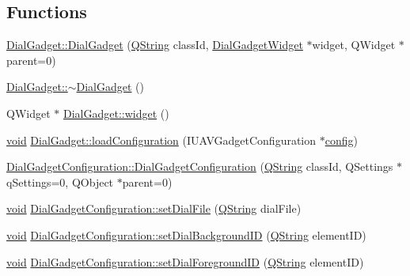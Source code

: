 \subsection*{Functions}
\begin{DoxyCompactItemize}
\item 
\hyperlink{group___dial_plugin_gaef5c9e1077a9a230622054bcc5337958}{Dial\-Gadget\-::\-Dial\-Gadget} (\hyperlink{group___u_a_v_objects_plugin_gab9d252f49c333c94a72f97ce3105a32d}{Q\-String} class\-Id, \hyperlink{class_dial_gadget_widget}{Dial\-Gadget\-Widget} $\ast$widget, Q\-Widget $\ast$parent=0)
\item 
\hyperlink{group___dial_plugin_ga9fc6ec1cdb4ac0de853c9b35950c4d11}{Dial\-Gadget\-::$\sim$\-Dial\-Gadget} ()
\item 
Q\-Widget $\ast$ \hyperlink{group___dial_plugin_ga1afd77bac7b60ceae978b7e74f9eddee}{Dial\-Gadget\-::widget} ()
\item 
\hyperlink{group___u_a_v_objects_plugin_ga444cf2ff3f0ecbe028adce838d373f5c}{void} \hyperlink{group___dial_plugin_ga571fd73249a763cfe4850be854e3dbc6}{Dial\-Gadget\-::load\-Configuration} (I\-U\-A\-V\-Gadget\-Configuration $\ast$\hyperlink{deflate_8c_a4473b5227787415097004fd39f55185e}{config})
\item 
\hyperlink{group___dial_plugin_ga5818a8a26f5b9e63b9bc37f459ca6594}{Dial\-Gadget\-Configuration\-::\-Dial\-Gadget\-Configuration} (\hyperlink{group___u_a_v_objects_plugin_gab9d252f49c333c94a72f97ce3105a32d}{Q\-String} class\-Id, Q\-Settings $\ast$q\-Settings=0, Q\-Object $\ast$parent=0)
\item 
\hyperlink{group___u_a_v_objects_plugin_ga444cf2ff3f0ecbe028adce838d373f5c}{void} \hyperlink{group___dial_plugin_ga7172a5e20f324dd2e11a31167ee87a9a}{Dial\-Gadget\-Configuration\-::set\-Dial\-File} (\hyperlink{group___u_a_v_objects_plugin_gab9d252f49c333c94a72f97ce3105a32d}{Q\-String} dial\-File)
\item 
\hyperlink{group___u_a_v_objects_plugin_ga444cf2ff3f0ecbe028adce838d373f5c}{void} \hyperlink{group___dial_plugin_gaed251d96de4cea86a69a9b52529c5c69}{Dial\-Gadget\-Configuration\-::set\-Dial\-Background\-I\-D} (\hyperlink{group___u_a_v_objects_plugin_gab9d252f49c333c94a72f97ce3105a32d}{Q\-String} element\-I\-D)
\item 
\hyperlink{group___u_a_v_objects_plugin_ga444cf2ff3f0ecbe028adce838d373f5c}{void} \hyperlink{group___dial_plugin_gae2dfdc5ebf459904a68d37b1401bf723}{Dial\-Gadget\-Configuration\-::set\-Dial\-Foreground\-I\-D} (\hyperlink{group___u_a_v_objects_plugin_gab9d252f49c333c94a72f97ce3105a32d}{Q\-String} element\-I\-D)

\end{DoxyCompactItemize}
